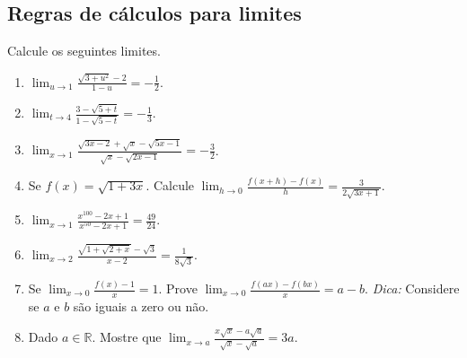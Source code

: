 \documentclass[latin,20pt]{article}
\begin{document}
    \subsection{Regras de cálculos para limites}   
   Calcule os seguintes limites.  
    \begin{enumerate}
    \item $\lim_{u \rightarrow 1} 
    \frac{\sqrt{3+u^2}-2}{1-u}=-\frac{1}{2}$.
    \item $\lim_{t \rightarrow 4} 
    \frac{3-\sqrt{5+t}}{1-\sqrt{5-t}}=-\frac{1}{3}$.
    \item $\lim_{x \rightarrow 1} 
    \frac{\sqrt{3x-2}+\sqrt{x}-\sqrt{5x-1}}
    {\sqrt{x}-\sqrt{2x-1}}=-\frac{3}{2}$.
    \item Se $f(x)=\sqrt{1+3x}$. Calcule 
    $\lim_{h \rightarrow 0} 
    \frac{f(x+h)-f(x)}
    {h}=\frac{3}{2\sqrt{3x+1}}$.
    \item $\lim_{x \rightarrow 1} 
    \frac{x^{100}-2x+1}
    {x^{50}-2x+1}=\frac{49}{24}$.
    \item $\lim_{x \rightarrow 2} 
    \frac{\sqrt{1+\sqrt{2+x}}-\sqrt{3}}
    {x-2}=\frac{1}{8\sqrt{3}}$.
     \item Se 
    $\lim_{x \rightarrow 0} 
    \frac{f(x)-1}
    {x}=1$. Prove $\lim_{x \rightarrow 0} 
    \frac{f(ax)-f(bx)}
    {x}=a-b$. {\it Dica:} Considere se $a$ e $b$ são iguais a zero ou não.
    \item Dado $a \in \mathbb{R}$. Mostre que $\lim_{x \rightarrow a} 
    \frac{x\sqrt{x}-a\sqrt{a}}
    {\sqrt{x}-\sqrt{a}}=3a$.
    \end{enumerate}
\end{document}
